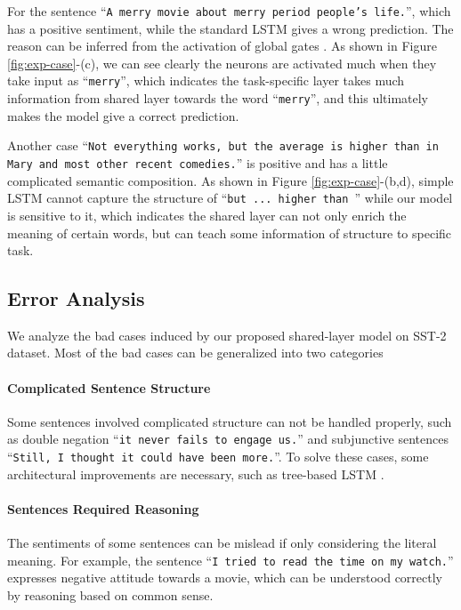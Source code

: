 \documentclass{article}
\begin{document}
For the sentence ``\texttt{A merry movie about merry period people's life.}'', which has a positive sentiment, while the standard LSTM gives a wrong prediction. The reason can be inferred from the activation of global gates .  As shown in Figure \ref{fig:exp-case}-(c), we can see clearly the neurons are activated much when they take input as ``\texttt{merry}'', which indicates the task-specific layer takes much information from shared layer towards the word ``\texttt{merry}'', and this ultimately makes the model give a correct prediction.

Another case ``\texttt{Not everything works, but the average is higher than in Mary and most other recent comedies.}''  is positive and has a little complicated semantic composition. As shown in Figure \ref{fig:exp-case}-(b,d), simple LSTM cannot capture the structure of ``\texttt{but ... higher than }'' while our model is sensitive to it, which indicates the shared layer can not only enrich the meaning of certain words, but can teach some information of structure to specific task.

\subsection{Error Analysis}
We analyze the bad cases induced by our proposed shared-layer model on SST-2 dataset. Most of the bad cases can be generalized into
two categories
\vspace{-1em}
\paragraph{Complicated Sentence Structure}
Some sentences involved complicated structure can not be handled properly, such as double negation ``\texttt{it never fails to engage us.}'' and  subjunctive sentences ``\texttt{Still, I thought it could have been more.}''. To solve these cases, some architectural improvements are necessary, such as tree-based LSTM \cite{tai2015improved}.

\vspace{-1em}
\paragraph{Sentences Required Reasoning}
The sentiments of some sentences can be mislead if only considering the literal meaning. For example, the sentence ``\texttt{I tried to read the time on my watch.}'' expresses  negative attitude towards a movie, which can be understood correctly by reasoning based on common sense.
\end{document}
